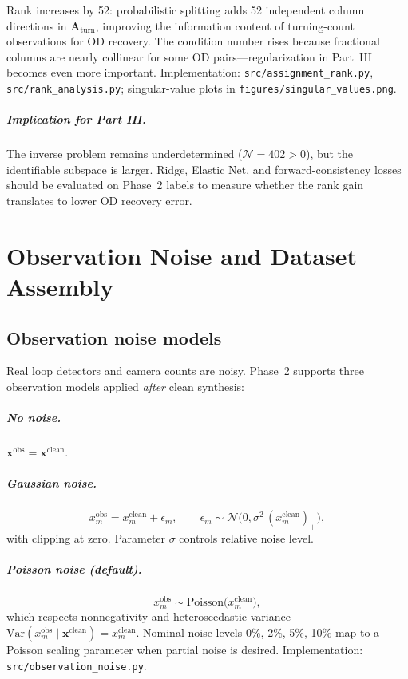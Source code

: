 \documentclass[11pt,a4paper]{report}
\newcommand{\mathbfx}{\mathbf{x}}
\newcommand{\Aturn}{\mathbf{A}_{\mathrm{turn}}}
\begin{document}
Rank increases by 52: probabilistic splitting adds 52 independent column directions in $\Aturn$, improving the information content of turning-count observations for OD recovery. The condition number rises because fractional columns are nearly collinear for some OD pairs---regularization in Part~III becomes even more important. Implementation: \texttt{src/assignment\_rank.py}, \texttt{src/rank\_analysis.py}; singular-value plots in \texttt{figures/singular\_values.png}.

\paragraph{Implication for Part III.}
The inverse problem remains underdetermined ($\mathcal{N}=402>0$), but the identifiable subspace is larger. Ridge, Elastic Net, and forward-consistency losses should be evaluated on Phase~2 labels to measure whether the rank gain translates to lower OD recovery error.


\chapter{Observation Noise and Dataset Assembly}
\label{ch:dataset}

\section{Observation noise models}

Real loop detectors and camera counts are noisy. Phase~2 supports three observation models applied \emph{after} clean synthesis:

\paragraph{No noise.}
$\mathbfx^{\mathrm{obs}} = \mathbfx^{\mathrm{clean}}$.

\paragraph{Gaussian noise.}
\begin{equation}
    x^{\mathrm{obs}}_m = x^{\mathrm{clean}}_m + \epsilon_m,
    \qquad \epsilon_m \sim \mathcal{N}\bigl(0,\sigma^2\,(x^{\mathrm{clean}}_m)_+\bigr),
    \label{eq:gauss_noise}
\end{equation}
with clipping at zero. Parameter $\sigma$ controls relative noise level.

\paragraph{Poisson noise (default).}
\begin{equation}
    x^{\mathrm{obs}}_m \sim \mathrm{Poisson}\bigl(x^{\mathrm{clean}}_m\bigr),
    \label{eq:poisson_noise}
\end{equation}
which respects nonnegativity and heteroscedastic variance $\mathrm{Var}(x^{\mathrm{obs}}_m\mid\mathbfx^{\mathrm{clean}})=x^{\mathrm{clean}}_m$. Nominal noise levels 0\%, 2\%, 5\%, 10\% map to a Poisson scaling parameter when partial noise is desired. Implementation: \texttt{src/observation\_noise.py}.
\end{document}
